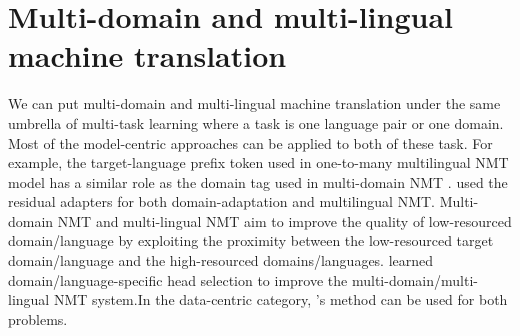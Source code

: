 \section{Multi-domain and multi-lingual machine translation}
We can put multi-domain and multi-lingual machine translation under the same umbrella of multi-task learning where a task is one language pair or one domain. Most of the model-centric approaches can be applied to both of these task. For example, the target-language prefix token used in one-to-many multilingual NMT model \citep{Aharoni19massively,Johnson17google} has a similar role as the domain tag used in multi-domain NMT \citep{Kobus17domain}. \citet{Bapna19simple} used the residual adapters for both domain-adaptation and multilingual NMT. Multi-domain NMT and multi-lingual NMT aim to improve the quality of low-resourced domain/language by exploiting the proximity between the low-resourced target domain/language and the high-resourced domains/languages. \citet{Gong21Pay} learned domain/language-specific head selection to improve the multi-domain/multi-lingual NMT system.In the data-centric category, \cite{Wang20balancing}'s method can be used for both problems.


































































